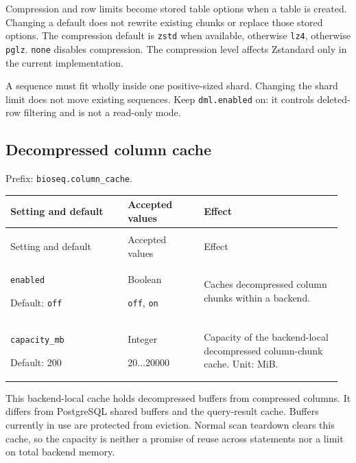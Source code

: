 Compression and row limits become stored table options when a table is created.
Changing a default does not rewrite existing chunks or replace those stored
options. The compression default is \texttt{zstd} when available, otherwise
\texttt{lz4}, otherwise \texttt{pglz}. \texttt{none} disables compression.
The compression level affects Zstandard only in the current implementation.

A sequence must fit wholly inside one positive-sized shard. Changing the shard
limit does not move existing sequences. Keep \texttt{dml.enabled} on: it controls
deleted-row filtering and is not a read-only mode.

\subsection{Decompressed column cache}

Prefix: \nolinkurl{bioseq.column_cache}.

\begingroup
\small
\setlength{\tabcolsep}{4pt}
\renewcommand{\arraystretch}{1.16}
\begin{longtable}{@{}>{\raggedright\arraybackslash}p{0.34\linewidth}>{\raggedright\arraybackslash}p{0.22\linewidth}>{\raggedright\arraybackslash}p{0.40\linewidth}@{}}
\toprule
Setting and default & Accepted values & Effect \\
\midrule
\endfirsthead
\multicolumn{3}{@{}l}{Prefix: \nolinkurl{bioseq.column_cache} (continued)} \\
\toprule
Setting and default & Accepted values & Effect \\
\midrule
\endhead
\bottomrule
\endfoot
\nolinkurl{enabled}\par Default: \texttt{off} & Boolean\par \texttt{off}, \texttt{on} & Caches decompressed column chunks within a backend. \\[4pt]
\nolinkurl{capacity_mb}\par Default: 200 & Integer\par $20\ldots 20000$ & Capacity of the backend-local decompressed column-chunk cache. Unit: MiB. \\[4pt]
\end{longtable}
\endgroup

This backend-local cache holds decompressed buffers from compressed columns.
It differs from PostgreSQL shared buffers and the query-result cache. Buffers
currently in use are protected from eviction. Normal scan teardown clears this
cache, so the capacity is neither a promise of reuse across statements nor a
limit on total backend memory.

